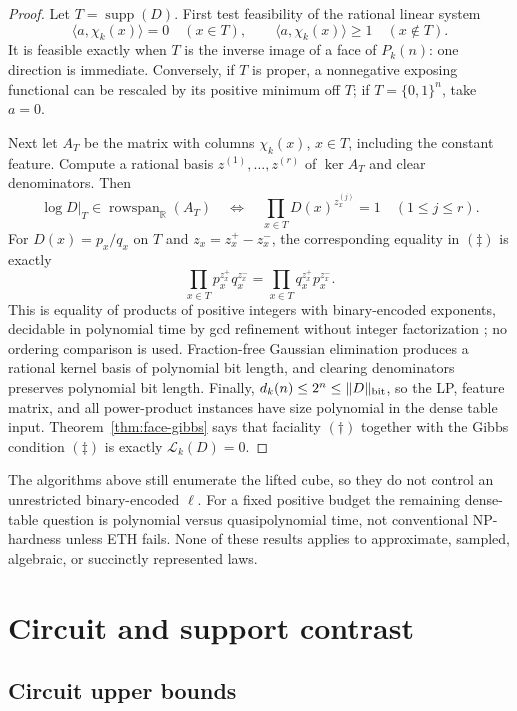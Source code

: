 \documentclass{article}
\newcommand{\LC}{\mathcal{L}}
\newcommand{\supp}{\operatorname{supp}}
\newcommand{\bits}{\{0,1\}}
\begin{document}
\begin{proof}
Let $T=\supp(D)$.  First test feasibility of the rational linear system
\[
  \langle a,\chi_k(x)\rangle=0\quad(x\in T),
  \qquad
  \langle a,\chi_k(x)\rangle\ge1\quad(x\notin T).
  \tag{\(\dagger\)}
\]
It is feasible exactly when $T$ is the inverse image of a face of $P_k(n)$:
one direction is immediate.  Conversely, if $T$ is proper, a nonnegative
exposing functional can be rescaled by its positive minimum off $T$; if
$T=\bits^n$, take $a=0$.

Next let $A_T$ be the matrix with columns $\chi_k(x)$, $x\in T$, including
the constant feature.  Compute a rational basis $z^{(1)},\ldots,z^{(r)}$ of
$\ker A_T$ and clear denominators.  Then
\[
  \log D|_T\in\operatorname{rowspan}_{\mathbb R}(A_T)
  \quad\Longleftrightarrow\quad
  \prod_{x\in T}D(x)^{z^{(j)}_x}=1
  \quad(1\le j\le r).
  \tag{\(\ddagger\)}
\]
For $D(x)=p_x/q_x$ on $T$ and
$z_x=z_x^+-z_x^-$, the corresponding equality in $(\ddagger)$ is exactly
\[
  \prod_{x\in T}p_x^{z_x^+}q_x^{z_x^-}
  =
  \prod_{x\in T}q_x^{z_x^+}p_x^{z_x^-}.
\]
This is equality of products of positive integers with binary-encoded
exponents, decidable in polynomial time by gcd refinement without integer
factorization \cite[Proposition~2.1]{etessami14}; no ordering comparison is
used.  Fraction-free Gaussian elimination produces a rational kernel basis of
polynomial bit length, and clearing denominators preserves polynomial bit
length.  Finally, $d_k(n)\le2^n\le\lVert D\rVert_{\rm bit}$, so the LP, feature
matrix, and all power-product instances have size polynomial in the dense
table input.
Theorem~\ref{thm:face-gibbs} says that faciality $(\dagger)$ together with the
Gibbs condition $(\ddagger)$ is exactly $\LC_k(D)=0$.
\end{proof}

The algorithms above still enumerate the lifted cube, so they do not control
an unrestricted binary-encoded $\ell$.  For a fixed positive budget the
remaining dense-table question is polynomial versus quasipolynomial time, not
conventional NP-hardness unless ETH fails.  None of these results applies to
approximate, sampled, algebraic, or succinctly represented laws.

\section{Circuit and support contrast}\label{sec:circuit-support}
\subsection{Circuit upper bounds}
\end{document}
